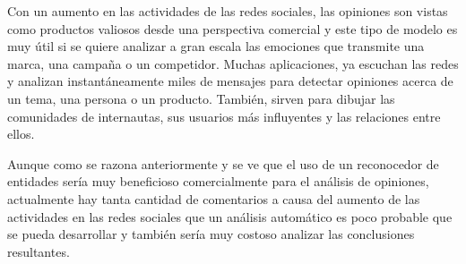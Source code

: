 \documentclass[11pt]{exam}
\begin{document}
\begin{questions}
Con un aumento en las actividades de las redes sociales, las opiniones son vistas como productos valiosos desde una perspectiva comercial y este tipo de modelo es muy útil si se quiere analizar a gran escala las emociones que transmite una marca, una campaña o un competidor. Muchas aplicaciones, ya escuchan las redes y analizan instantáneamente miles de mensajes para detectar opiniones acerca de un tema, una persona o un producto. También, sirven para dibujar las comunidades de internautas, sus usuarios más influyentes y las relaciones entre ellos.

Aunque como se razona anteriormente y se ve que el uso de un reconocedor de entidades sería muy beneficioso comercialmente para el análisis de opiniones, actualmente hay tanta cantidad de comentarios a causa del aumento de las actividades en las redes sociales que un análisis automático es poco probable que se pueda desarrollar y también sería muy costoso analizar las conclusiones resultantes.

\end{questions}
\end{document}
